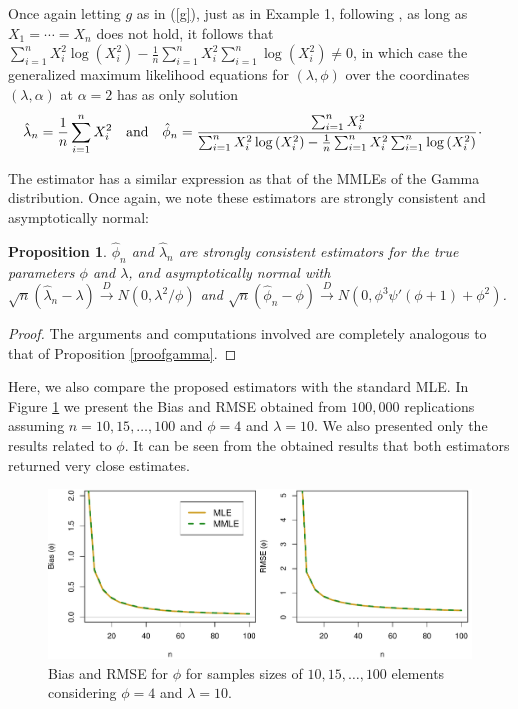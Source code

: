 \documentclass[12pt]{article} %
\newtheorem{proposition}{Proposition}
\theoremstyle{definition}
\begin{document}
Once again letting $g$ as in (\ref{g}), just as in Example 1, following \cite{ramos2020bias}, as long as $X_1=\cdots=X_n$ does not hold, it follows that $\sum_{i=1}^n X_i^2 \log\left(X_i^2\right) -\frac{1}{n}\sum_{i=1}^n X_i^2\sum_{i=1}^n \log\left(X_i^2\right)\neq 0$, in which case the generalized maximum likelihood equations for $(\lambda,\phi)$ over the coordinates $(\lambda,\alpha)$ at $\alpha=2$ has as only solution
\begin{equation*}\label{vinkom}
\begin{aligned}
&\hat\lambda_n=\frac{1}{n}\sum_{i=1}^n{X_i^2} \ \ \mbox{ and } \ \
\hat\phi_n=\cfrac{\sum_{i=1}^n X_i^{2}}{\sum_{i=1}^{n}X_i^{2} \log\left(X_i^2\right) - \frac{1}{n}\sum_{i=1}^n X_i^{2} \sum_{i=1}^n \log\left(X_i^2\right)} \, \cdot
\end{aligned}
\end{equation*}

The estimator has a similar expression as that of the MMLEs of the Gamma distribution. Once again, we note these estimators are strongly consistent and asymptotically normal:

\begin{proposition}\label{proofnakagami} $\hat\phi_n$ and $\hat\lambda_n$ are strongly consistent estimators for the true parameters $\phi$ and $\lambda$, and asymptotically normal with $\sqrt{n}\left(\hat{\lambda}_n-\lambda\right)\overset{D}{\to} N\left(0,\lambda^2/\phi\right)$ and $\sqrt{n}\left(\hat{\phi}_n-\phi\right)\overset{D}{\to} N\left(0,\phi^3\psi'(\phi+1)+\phi^2\right)$.
\end{proposition}
\begin{proof} The arguments and computations involved are completely analogous to that of Proposition \ref{proofgamma}.
\end{proof}

Here, we also compare the proposed estimators with the standard MLE. In Figure \ref{fg2} we present the Bias and RMSE obtained from $100,000$ replications assuming $n=10,15,\ldots,100$ and $\phi=4$ and $\lambda=10$. We also presented only the results related to $\phi$. It can be seen from the obtained results that both estimators returned very close estimates.

\begin{figure}[!ht]
\centering
\includegraphics[scale=0.6]{biasnakagami.pdf}	
\caption{Bias and RMSE for $\phi$ for samples sizes of $10,15,\ldots,100$ elements considering $\phi=4$ and $\lambda=10$.}\label{fg2}
\end{figure}	
\end{document}
